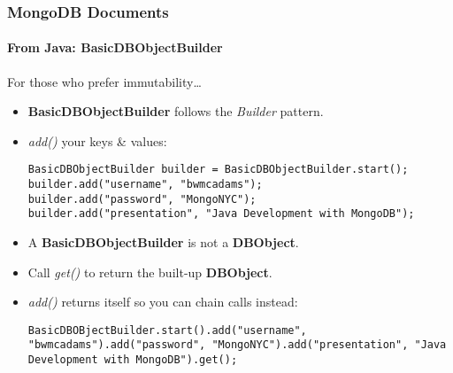 \documentclass{beamer}
\begin{document}
\begin{frame}[fragile]
\frametitle{MongoDB Documents}
\framesubtitle{From Java: BasicDBObjectBuilder}
    For those who prefer immutability\dots
    \begin{itemize}
        \item {\bf BasicDBObjectBuilder} follows the {\em Builder} pattern.
        \item<2-> {\em add()} your keys \& values:\\
\begin{lstlisting}
BasicDBObjectBuilder builder = BasicDBObjectBuilder.start();
builder.add("username", "bwmcadams");
builder.add("password", "MongoNYC");
builder.add("presentation", "Java Development with MongoDB");
\end{lstlisting}
        \item<3-> A {\bf BasicDBObjectBuilder} is not a {\bf DBObject}. 
        \item<3-> Call {\em get()} to return the built-up {\bf DBObject}.
        \item<4-> {\em add()} returns itself so you can chain calls instead: 
\begin{lstlisting}
BasicDBOBjectBuilder.start().add("username", "bwmcadams").add("password", "MongoNYC").add("presentation", "Java Development with MongoDB").get();
\end{lstlisting}
    \end{itemize}
\end{frame}
\end{document}

